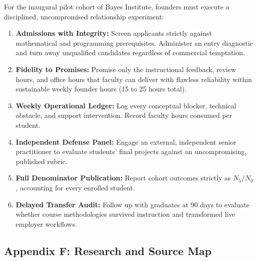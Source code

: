 For the inaugural pilot cohort of Bayes Institute, founders must execute a disciplined, uncompromised relationship experiment:
\begin{enumerate}[leftmargin=*]
\item \textbf{Admissions with Integrity:} Screen applicants strictly against mathematical and programming prerequisites. Administer an entry diagnostic and turn away unqualified candidates regardless of commercial temptation.
\item \textbf{Fidelity to Promises:} Promise only the instructional feedback, review hours, and office hours that faculty can deliver with flawless reliability within sustainable weekly founder hours (15 to 25 hours total).
\item \textbf{Weekly Operational Ledger:} Log every conceptual blocker, technical obstacle, and support intervention. Record faculty hours consumed per student.
\item \textbf{Independent Defense Panel:} Engage an external, independent senior practitioner to evaluate students' final projects against an uncompromising, published rubric.
\item \textbf{Full Denominator Publication:} Report cohort outcomes strictly as $N_5 / N_0$, accounting for every enrolled student.
\item \textbf{Delayed Transfer Audit:} Follow up with graduates at 90 days to evaluate whether course methodologies survived instruction and transformed live employer workflows.
\end{enumerate}

\subsection*{Appendix F: Research and Source Map}

